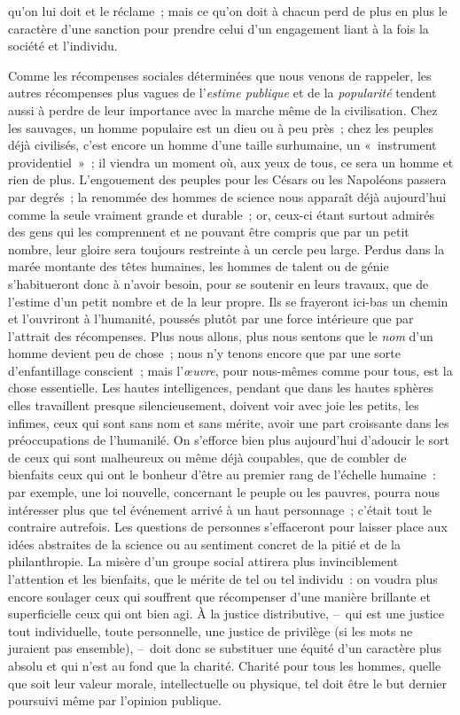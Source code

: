 \documentclass[french,twoside]{book} %
\begin{document}
qu’on lui doit et le réclame ; mais ce qu’on doit à chacun perd de plus en plus le caractère d’une sanction pour prendre celui d’un engagement liant à la fois la société et l’individu.\par
Comme les récompenses sociales déterminées que nous venons de rappeler, les autres récompenses plus vagues de l’\emph{estime publique} et de la \emph{popularité} tendent aussi à perdre de leur importance avec la marche même de la civilisation. Chez les sauvages, un homme populaire est un dieu ou à peu près ; chez les peuples déjà civilisés, c’est encore un homme d’une taille surhumaine, un « instrument providentiel » ; il viendra un moment où, aux yeux de tous, ce sera un homme et rien de plus. L’engouement des peuples pour les Césars ou les Napoléons passera par degrés ; la renommée des hommes de science nous apparaît déjà aujourd’hui comme la seule vraiment grande et durable ; or, ceux-ci étant surtout admirés des gens qui les comprennent et ne pouvant être compris que par un petit nombre, leur gloire sera toujours restreinte à un cercle peu large. Perdus dans la marée montante des têtes humaines, les hommes de talent ou de génie s’habitueront donc à n’avoir besoin, pour se soutenir en leurs travaux, que de l’estime d’un petit nombre et de la leur propre. Ils se frayeront ici-bas un chemin et l’ouvriront à l’humanité, poussés plutôt par une force intérieure que par l’attrait des récompenses. Plus nous allons, plus nous sentons que le \emph{nom} d’un homme devient peu de chose ; nous n’y tenons encore que par une sorte d’enfantillage conscient ; mais l’\emph{œuvre}, pour nous-mêmes comme pour tous, est la chose essentielle. Les hautes intelligences, pendant que dans les hautes sphères elles travaillent presque silencieusement, doivent voir avec joie les petits, les infimes, ceux qui sont sans nom et sans mérite, avoir une part croissante dans les préoccupations de l’humanilé. On s’efforce bien plus aujourd’hui d’adoucir le sort de ceux qui sont malheureux ou même déjà coupables, que de combler de bienfaits ceux qui ont le bonheur d’être au premier rang de l’échelle humaine : par exemple, une loi nouvelle, concernant le peuple ou les pauvres, pourra nous intéresser plus que tel événement arrivé à un haut personnage ; c’était tout le contraire autrefois. Les questions de personnes s’effaceront pour laisser place aux idées abstraites de la science ou au sentiment concret de la pitié et de la philanthropie. La misère d’un groupe social attirera plus invinciblement l’attention et les bienfaits, que le mérite de tel ou tel individu : on voudra plus encore soulager ceux qui souffrent que récompenser d’une manière brillante et superficielle ceux qui ont bien agi. À la justice distributive, – qui est une justice tout individuelle, toute personnelle, une justice de privilège (si les mots ne juraient pas ensemble), – doit donc se substituer une équité d’un caractère plus absolu et qui n’est au fond que la charité. Charité pour tous les hommes, quelle que soit leur valeur morale, intellectuelle ou physique, tel doit être le but dernier poursuivi même par l’opinion publique.
\end{document}
